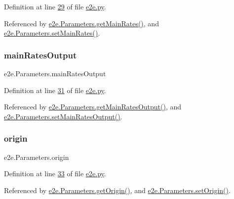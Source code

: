 Definition at line \hyperlink{e2e_8py_source_l00029}{29} of file \hyperlink{e2e_8py_source}{e2e.\+py}.



Referenced by \hyperlink{e2e_8py_source_l00058}{e2e.\+Parameters.\+get\+Main\+Rates()}, and \hyperlink{e2e_8py_source_l00055}{e2e.\+Parameters.\+set\+Main\+Rates()}.

\mbox{\label{classe2e_1_1_parameters_a552470d8541b7caf2bb8940e32a6fe0e}} 
\subsubsection{\texorpdfstring{main\+Rates\+Output}{mainRatesOutput}}
{\footnotesize\ttfamily e2e.\+Parameters.\+main\+Rates\+Output}



Definition at line \hyperlink{e2e_8py_source_l00031}{31} of file \hyperlink{e2e_8py_source}{e2e.\+py}.



Referenced by \hyperlink{e2e_8py_source_l00070}{e2e.\+Parameters.\+get\+Main\+Rates\+Output()}, and \hyperlink{e2e_8py_source_l00067}{e2e.\+Parameters.\+set\+Main\+Rates\+Output()}.

\mbox{\label{classe2e_1_1_parameters_aff4d7aaa35295f7f71e546fe5554c4d9}} 
\subsubsection{\texorpdfstring{origin}{origin}}
{\footnotesize\ttfamily e2e.\+Parameters.\+origin}



Definition at line \hyperlink{e2e_8py_source_l00033}{33} of file \hyperlink{e2e_8py_source}{e2e.\+py}.



Referenced by \hyperlink{e2e_8py_source_l00082}{e2e.\+Parameters.\+get\+Origin()}, and \hyperlink{e2e_8py_source_l00079}{e2e.\+Parameters.\+set\+Origin()}.

\mbox{\label{classe2e_1_1_parameters_ab1ac2fc0ab2f3ef169b776c776cdb225}} 
